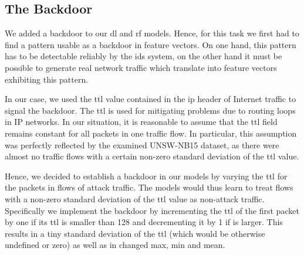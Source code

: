 \documentclass[10pt,sigconf,letterpaper,dvipsnames]{acmart}
\begin{document}
\subsection{The Backdoor}

We added a backdoor to our \gls{dl} and \gls{rf} models. %
Hence, for this task we first had to find a pattern usable as a backdoor in feature vectors. On one hand, this pattern has to be detectable reliably by the \gls{ids} system, on the other hand it must be possible to generate real network traffic which translate into feature vectors exhibiting this  pattern.

In our case, we used the \gls{ttl} value contained in the \gls{ip} header of Internet traffic to signal the backdoor. The \gls{ttl} is used for mitigating problems due to routing loops in IP networks. In our situation, it is reasonable to assume that the \gls{ttl} field remains constant for all packets in one traffic flow. In particular, this assumption was perfectly reflected by the examined UNSW-NB15 dataset, as there were almost no traffic flows with a certain non-zero standard deviation of the \gls{ttl} value.

Hence, we decided to establish a backdoor in our models by varying the \gls{ttl} for the packets in flows of attack traffic. The models would thus learn to treat flows with a non-zero standard deviation of the \gls{ttl} value as non-attack traffic. Specifically we implement the backdoor by incrementing the \gls{ttl} of the first packet by one if its \gls{ttl} is smaller than 128 and decrementing it by 1 if is larger. This results in a tiny standard deviation of the \gls{ttl} (which would be otherwise undefined or zero) as well as in changed max, min and mean.
\end{document}
